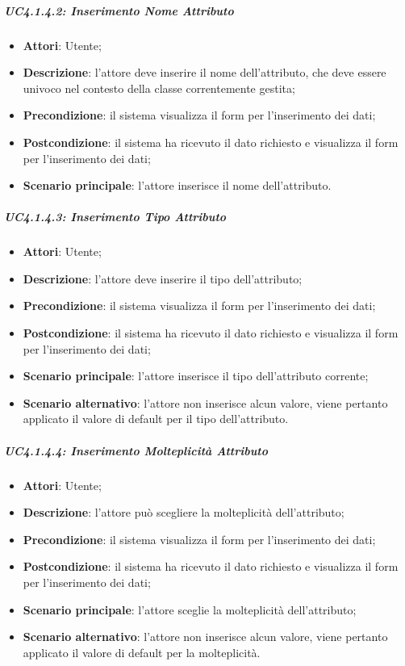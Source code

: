 \subparagraph{UC4.1.4.2: Inserimento Nome Attributo}
\label{UC4.1.4.2}
\begin{itemize}
	\item \textbf{Attori}: Utente;
	\item \textbf{Descrizione}: l'attore deve inserire il nome dell'attributo, che deve essere univoco nel contesto della classe correntemente gestita;
	\item \textbf{Precondizione}: il sistema visualizza il form per l'inserimento dei dati;
	\item \textbf{Postcondizione}: il sistema ha ricevuto il dato richiesto e visualizza il form per l'inserimento dei dati;
	\item \textbf{Scenario principale}: l'attore inserisce il nome dell'attributo.
\end{itemize}

\subparagraph{UC4.1.4.3: Inserimento Tipo Attributo}
\label{UC4.1.4.3}
\begin{itemize}
	\item \textbf{Attori}: Utente;
	\item \textbf{Descrizione}: l'attore deve inserire il tipo dell'attributo;
	\item \textbf{Precondizione}: il sistema visualizza il form per l'inserimento dei dati;
	\item \textbf{Postcondizione}: il sistema ha ricevuto il dato richiesto e visualizza il form per l'inserimento dei dati;
	\item \textbf{Scenario principale}: l'attore inserisce il tipo dell'attributo corrente;
	\item \textbf{Scenario alternativo}: l'attore non inserisce alcun valore, viene pertanto applicato il valore di default per il tipo dell'attributo.
\end{itemize}

\subparagraph{UC4.1.4.4: Inserimento Molteplicità Attributo}
\label{UC4.1.4.4}
\begin{itemize}
	\item \textbf{Attori}: Utente;
	\item \textbf{Descrizione}: l'attore può scegliere la molteplicità dell'attributo;
	\item \textbf{Precondizione}: il sistema visualizza il form per l'inserimento dei dati;
	\item \textbf{Postcondizione}: il sistema ha ricevuto il dato richiesto e visualizza il form per l'inserimento dei dati;
	\item \textbf{Scenario principale}: l'attore sceglie la molteplicità dell'attributo;
	\item \textbf{Scenario alternativo}: l'attore non inserisce alcun valore, viene pertanto applicato il valore di default per la molteplicità.
\end{itemize}

